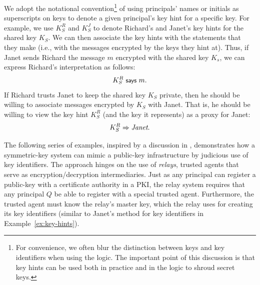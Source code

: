 We adopt the notational convention\footnote{For convenience, we often
  blur the distinction between keys and key identifiers when using the
  logic.  The important point of this discussion is that key hints can
  be used both in practice and in the logic to shroud secret keys.} of
using principals' names or initials as superscripts on keys to denote
a given principal's key hint for a specific key.  For example, we use
$K_{S}^{R}$ and
$K_{S}^{J}$ to denote Richard's and Janet's key hints for the shared
key $K_S$.  We can then associate the key hints with the statements
that they make (i.e., with the messages encrypted by the keys they
hint at).  Thus, if Janet sends Richard the message $m$ encrypted with
the shared key $K_s$, we can express Richard's interpretation as
follows:
\[ K_{S}^{R} \text{\small\textsf{ says }} m. \]
If Richard trusts Janet to keep the shared key $K_S$ private, then he
should be willing to associate messages encrypted by $K_S$ with Janet.
That is, he should be willing to view the key hint
$K_{S}^{R}$ (and the key it represents) as a proxy for
Janet:
\[ K_{S}^{R} \Rightarrow \textit{Janet}. \]






The following series of examples, inspired by a discussion in
\cite{LABW}, demonstrates how a symmetric-key system can mimic a
public-key infrastructure by judicious use of key identifiers.  The
approach hinges on the use of
\emph{relays}, trusted agents that serve
as encryption/decryption intermediaries.  Just as any principal can
register a public-key with a certificate authority in a PKI,
the relay system
requires that any principal $Q$ be able to register with a special
trusted agent.  Furthermore, the trusted agent must know the relay's
master key, which the relay uses for creating its
key identifiers
(similar to Janet's method for key identifiers in
Example~\ref{ex:key-hints}).

